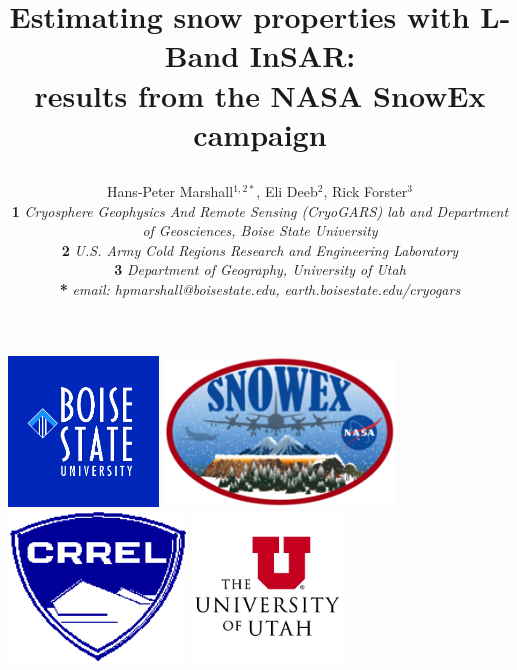 \documentclass[landscape,a0b,final]{a0poster}
\title{\begin{center} Estimating snow properties with L-Band InSAR: \\ results from the NASA SnowEx campaign \end{center} }
\author{ \LARGE{Hans-Peter Marshall$^{1,2*}$, Eli Deeb$^2$, Rick Forster$^3$} \\ %
\textbf{1} \textit{Cryosphere Geophysics And Remote Sensing (CryoGARS) lab and Department of Geosciences, Boise State University} \\
\textbf{2} \textit{U.S. Army Cold Regions Research and Engineering Laboratory} \\
\textbf{3} \textit{Department of Geography, University of Utah} \\
\textbf{*} \textit{email: hpmarshall@boisestate.edu, earth.boisestate.edu/cryogars}}
\begin{document}

\colorbox{boxcol}{		%
\begin{minipage}[c]{0.75\textwidth}	%
\maketitle
\end{minipage}

\begin{minipage}[c]{0.23\textwidth}
\begin{flushright}
\includegraphics[height=4cm]{BSU.png} \hspace{0.2cm}  \includegraphics[height=4cm]{SnowExLogo.png} \vspace{0.2cm}
\includegraphics[height=4cm]{CRRELlogo.png} \hspace{0.2cm} \includegraphics[height=4cm]{UnivUtahlogo.jpg} \hspace{0.2cm}

\end{flushright}
\end{minipage}}
\end{document}
